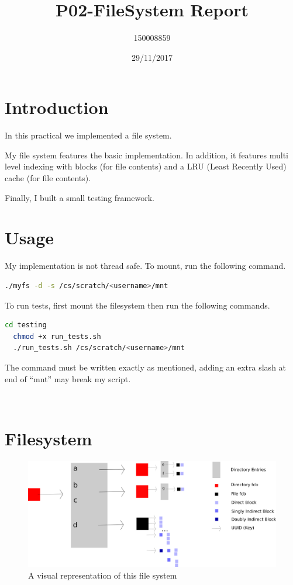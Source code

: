 \documentclass{article}
\title{P02-FileSystem Report}
\date{29/11/2017}
\author{150008859}
\begin{document}
\maketitle
\newpage

\section{Introduction}

In this practical we implemented a file system.

My file system features the basic implementation. In addition, it features  multi level indexing with blocks (for file contents) and a LRU (Least Recently Used) cache (for file contents).

Finally, I built a small testing framework.

\section{Usage}

My implementation is not thread safe. To mount, run the following command.

\begin{lstlisting}[language=bash]
  ./myfs -d -s /cs/scratch/<username>/mnt
\end{lstlisting}

To run tests, first mount the filesystem then run the following commands.

\begin{lstlisting}[language=bash]
  cd testing
  chmod +x run_tests.sh
  ./run_tests.sh /cs/scratch/<username>/mnt
\end{lstlisting}

The command must be written exactly as mentioned, adding an extra slash at end of ``mnt'' may break my script.

\begin{lstlisting}
  
\end{lstlisting}

\section{Filesystem}

\begin{figure}[!htb]
  \caption{A visual representation of this file system}
  \center
\includegraphics[scale=0.30]{images/diagram.png}
\end{figure}
\end{document}
